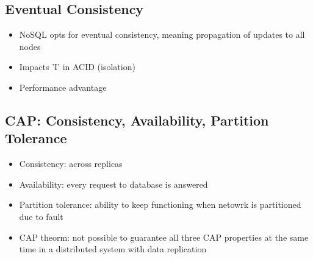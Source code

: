 \documentclass[12pt]{article}
\begin{document}
		\subsection*{Eventual Consistency}
		\begin{itemize}
			\item
				NoSQL opts for eventual consistency, meaning propagation of updates to all nodes
			\item
				Impacts 'I' in ACID (isolation)
			\item
				Performance advantage
		\end{itemize}
		\subsection*{CAP: Consistency, Availability, Partition Tolerance}
		\begin{itemize}
			\item
				Consistency: across replicas
			\item
				Availability: every request to database is answered
			\item
				Partition tolerance: ability to keep functioning when netowrk is partitioned due to fault
			\item
				CAP theorm: not possible to guarantee all three CAP properties at the same time in a distributed system with data replication
		\end{itemize}
\end{document}
